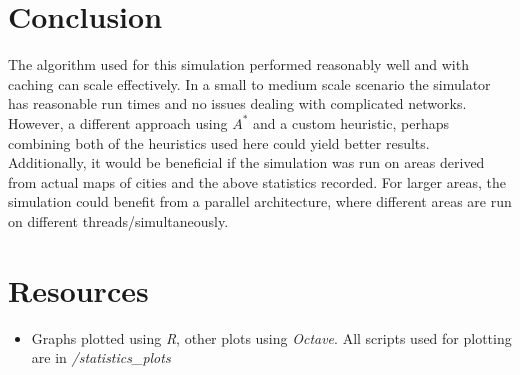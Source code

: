 \documentclass{article}
\begin{document}
		\section{Conclusion}
		The algorithm used for this simulation performed reasonably well and with caching can scale effectively. In a small to medium scale scenario
		the simulator has reasonable run times and no issues dealing with complicated networks. However, a different approach
		using $A^*$ and a custom heuristic, perhaps combining both of the heuristics used here could yield better results. Additionally, it would
		be beneficial if the simulation was run on areas derived from actual maps of cities and the above statistics recorded. For larger areas,
		the simulation could benefit from a parallel architecture, where different areas are run on different threads/simultaneously.

		\section{Resources}
		\begin{itemize}
			\item Graphs plotted using \textit{R}, other plots using \textit{Octave}. All scripts used for plotting are in \textit{/statistics\_plots}
		\end{itemize}
\end{document}
